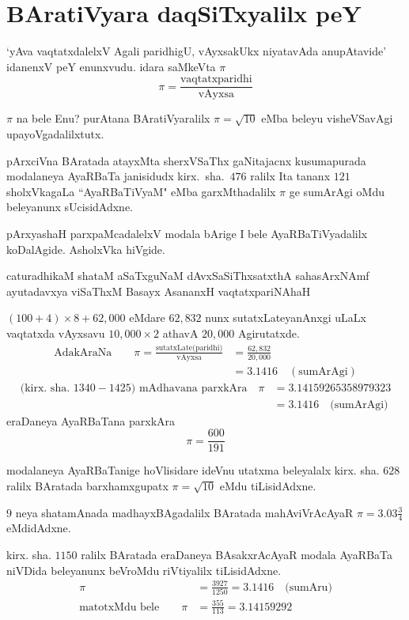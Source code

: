 \chapter{BAratiVyara daqSiTxyalilx peY}

`yAva vaqtatxdalelxV Agali paridhigU, vAyxsakUkx niyatavAda anupAtavide' idanenxV peY enunxvudu. idara saMkeVta $\pi$
$$
\pi = \frac{\text{vaqtatxparidhi}}{\text{vAyxsa}}
$$

$\pi$ na bele Enu? purAtana BAratiVyaralilx $\pi = \sqrt{10}$ eMba beleyu visheVSa\-vAgi upayoVgadalilxtutx.

pArxciVna BAratada atayxMta sherxVSaThx gaNitajacnx kusumapurada modalaneya AyaRBaTa janisidudx kirx.~sha.\ $476$ ralilx Ita tananx $121$ sholxVkagaLa ``AyaRBaTiVyaM" eMba garxMthadalilx $\pi$ ge sumArAgi oMdu beleyanunx sUcisidAdxne.

pArxyashaH parxpaMcadalelxV modala bArige I bele AyaRBaTiVyadalilx koDa\-lAgide. AsholxVka hiVgide.

\begin{center}
caturadhikaM shataM aSaTxguNaM dAvxSaSiThxsatxthA sahasArxNAmf\\
ayutadavxya viSaThxM Basayx AsananxH vaqtatxpariNAhaH
\end{center} 
 
$(100+4)\times 8 + 62,000$ eMdare $62,832$ nunx sutatxLateyanAnxgi uLaLx vaqtatxda vAyxsavu $10,000\times 2$ athavA $20,000$ Agirutatxde.
\begin{align*}
\text{AdakAraNa}\qquad \pi = \frac{\text{sutatxLate(paridhi)}}{\text{vAyxsa}} &= \frac{62,832}{20,000}\\
&= 3.1416\quad(\text{sumArAgi}) 
\end{align*} 
\begin{align*}
\text{(kirx.~sha.\ $1340-1425$) mAdhavana parxkAra} \quad\pi &= 3.14159265358979323\\
&=3.1416 \quad\text{(sumArAgi)}  
\end{align*}
eraDaneya AyaRBaTana parxkAra
$$
\pi = \frac{600}{191}
$$

modalaneya AyaRBaTanige hoVlisidare ideVnu utatxma beleyalalx kirx. sha. $628$ ralilx BAratada barxhamxgupatx $\pi = \sqrt{10}$ eMdu tiLisidAdxne.

$9$ neya shatamAnada madhayxBAgadalilx BAratada mahAviVrAcAyaR $\pi = 3.03\frac{3}{4}$ eMdidAdxne.

kirx. sha. $1150$ ralilx BAratada eraDaneya BAsakxrAcAyaR modala AyaRBaTa niVDida beleyanunx beVroMdu riVtiyalilx tiLisidAdxne.
\begin{align*}
\pi &= \frac{3927}{1250} = 3.1416 \quad\text{(sumAru)}\\
\text{matotxMdu bele}\qquad \pi &= \frac{355}{113} = 3.14159292
\end{align*}

